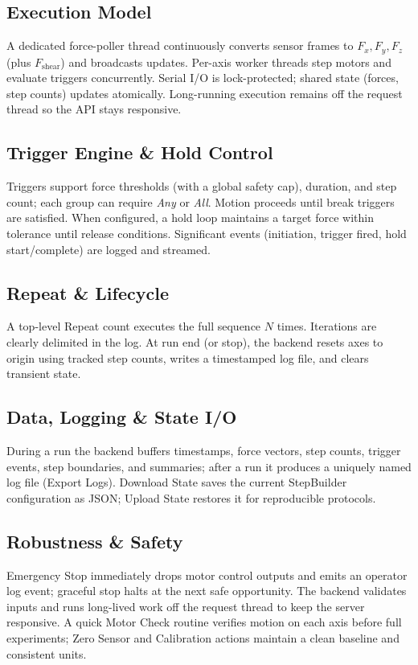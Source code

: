 \documentclass[
    twocolumn,
    fontsize = 10pt,
    parskip = half+,
    headings = small,
    headwidth = text,
    footwidth = text,
]{scrartcl}
\begin{document}
\subsection{Execution Model}
A dedicated force-poller thread continuously converts sensor frames to $F_x, F_y, F_z$ (plus $F_{\text{shear}}$) and broadcasts updates. Per-axis worker threads step motors and evaluate triggers concurrently. Serial I/O is lock-protected; shared state (forces, step counts) updates atomically. Long-running execution remains off the request thread so the API stays responsive.

\subsection{Trigger Engine \& Hold Control}
Triggers support force thresholds (with a global safety cap), duration, and step count; each group can require \emph{Any} or \emph{All}. Motion proceeds until break triggers are satisfied. When configured, a hold loop maintains a target force within tolerance until release conditions. Significant events (initiation, trigger fired, hold start/complete) are logged and streamed.

\subsection{Repeat \& Lifecycle}
A top-level Repeat count executes the full sequence $N$ times. Iterations are clearly delimited in the log. At run end (or stop), the backend resets axes to origin using tracked step counts, writes a timestamped log file, and clears transient state.

\subsection{Data, Logging \& State I/O}
During a run the backend buffers timestamps, force vectors, step counts, trigger events, step boundaries, and summaries; after a run it produces a uniquely named log file (Export Logs). Download State saves the current StepBuilder configuration as JSON; Upload State restores it for reproducible protocols.

\subsection{Robustness \& Safety}
Emergency Stop immediately drops motor control outputs and emits an operator log event; graceful stop halts at the next safe opportunity. The backend validates inputs and runs long-lived work off the request thread to keep the server responsive. A quick Motor Check routine verifies motion on each axis before full experiments; Zero Sensor and Calibration actions maintain a clean baseline and consistent units.
\end{document}

